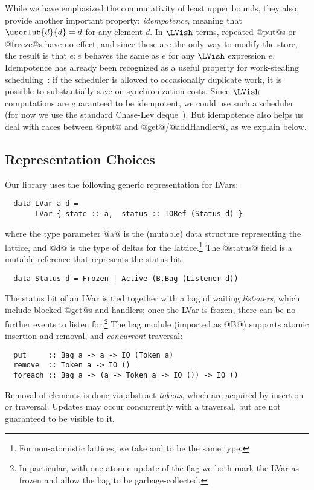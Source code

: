 While we have emphasized the commutativity of least upper bounds, they also
provide another important property: \emph{idempotence}, meaning that
$\userlub{d}{d} = d$ for any element $d$.  In $\LVish$ terms, repeated @put@s or @freeze@s
have no effect, and since these are the only way to modify the store, the
result is that $e; e$ behaves the same as $e$ for any $\LVish$ expression $e$.  
Idempotence has already been recognized as a useful property for work-stealing
scheduling~\cite{idempotent}: if the scheduler is allowed to occasionally duplicate work, it is
possible to substantially save on synchronization costs.  Since $\LVish$
computations are guaranteed to be idempotent, we could use such a scheduler
(for now we use the standard Chase-Lev deque~\cite{ChaseLev}).  But idempotence
also helps us deal with races between @put@ and @get@/@addHandler@, as we explain below.

\subsection{Representation Choices}
Our library uses the following generic representation for LVars:
\begin{lstlisting}
  data LVar a d = 
       LVar { state :: a,  status :: IORef (Status d) }
\end{lstlisting}
where the type parameter @a@ is the (mutable) data structure representing the
lattice, and @d@ is the type of deltas for the lattice.\footnote{For
  non-atomistic lattices, we take  and  to be the same type.}
The @status@ field is a mutable reference that represents the status bit:
\begin{lstlisting}
  data Status d = Frozen | Active (B.Bag (Listener d))
\end{lstlisting}
The status bit of an LVar is tied together with a bag of waiting
\emph{listeners}, which include blocked @get@s and handlers; once the LVar is
frozen, there can be no further events to listen for.\footnote{In particular,
  with one atomic update of the flag we both mark the LVar as frozen and allow
  the bag to be garbage-collected.}  The bag module (imported as @B@) supports
atomic insertion and removal, and \emph{concurrent} traversal:
\begin{lstlisting}
  put     :: Bag a -> a -> IO (Token a)
  remove  :: Token a -> IO ()
  foreach :: Bag a -> (a -> Token a -> IO ()) -> IO ()
\end{lstlisting}
Removal of elements is done via abstract \emph{tokens}, which are acquired by
insertion or traversal.  Updates may occur concurrently with a traversal, but
are not guaranteed to be visible to it.

